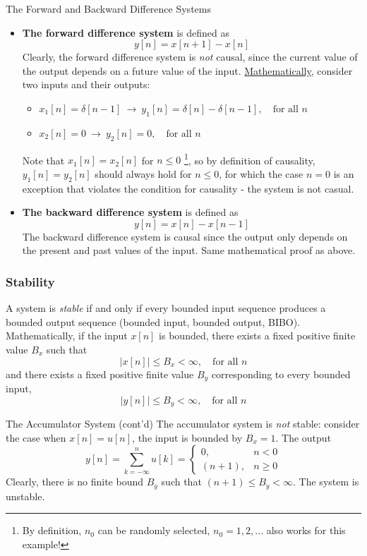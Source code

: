\begin{ex}{The Forward and Backward Difference Systems}
\begin{itemize}
    \item \textbf{The forward difference system} is defined as
    \[
        y[n] = x[n+1] - x[n]
    \]
    Clearly, the forward difference system is \textit{not} causal, since the current value of the output depends on a future value of the input. \underline{Mathematically,} consider two inputs and their outputs:
    \begin{itemize}
        \item $x_1[n]=\delta[n-1] \ \longrightarrow \ y_1[n]=\delta[n]-\delta[n-1], \quad \text{for all $n$}$

        \item $x_2[n]=0 \ \longrightarrow \ y_2[n]=0, \quad \text{for all $n$}$
    \end{itemize}

    Note that $x_1[n] = x_2[n]$ for $n \leq 0$ \footnote{ By definition, $n_0$ can be randomly selected, $n_0=1, 2,...$ also works for this example!}, so by definition of causality, $y_1[n] = y_2[n]$ should always hold for $n \leq 0$, for which the case $n=0$ is an exception that violates the condition for causality - the system is not casual. %

    \item \textbf{The backward difference system} is defined as
    \[
        y[n] = x[n] - x[n-1]
    \]
    The backward difference system is causal since the output only depends on the present and past values of the input. Same mathematical proof as above.
\end{itemize}
\end{ex}
\subsubsection{Stability}
A system is \textit{stable} if and only if every bounded input sequence produces a bounded output sequence (bounded input, bounded output, BIBO). Mathematically, if the input $x[n]$ is bounded, there exists a fixed positive finite value $B_x$ such that 
\[
    \lvert x[n] \rvert \leq B_x < \infty, \quad \text{for all $n$}
\]
and there exists a fixed positive finite value $B_y$ corresponding to every bounded input, 
\[
     \lvert y[n] \rvert \leq B_y < \infty, \quad \text{for all $n$}
\]

\begin{ex}{The Accumulator System (cont'd)}
    The accumulator system is \textit{not} stable: consider the case when $x[n]=u[n]$, the input is bounded by $B_x = 1$. The output 
    \[
        y[n] = \sum_{k=-\infty}^{n}u[k] = 
        \begin{cases}
        0,      & n<0   \\
        (n+1),  & n \geq 0
        \end{cases}
    \]
    Clearly, there is no finite bound $B_y$ such that $(n+1) \leq B_y < \infty$. The system is unstable.
\end{ex}

